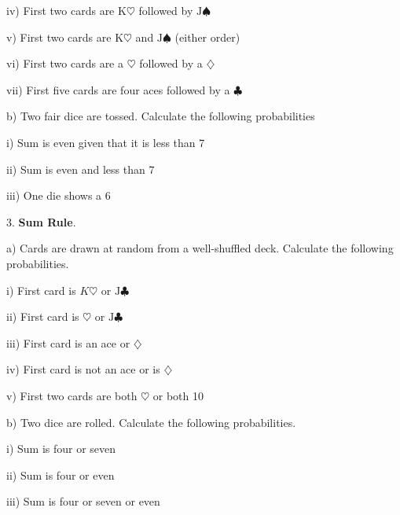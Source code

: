 \documentclass[10pt]{article}
\begin{document}
\hspace{30pt} iv) First two cards are $\mbox{K}\heartsuit$ followed by $\mbox{J}\spadesuit$
\bigskip

\hspace{30pt} v) First two cards are $\mbox{K}\heartsuit$ 
and $\mbox{J}\spadesuit$ (either order)
\bigskip

\hspace{30pt} vi) First two cards are a $\heartsuit$ followed by a $\diamondsuit$
\bigskip

\hspace{30pt} vii) First five cards are four aces followed by a $\clubsuit$
\bigskip

\hspace{20pt} b)  Two fair dice are tossed. Calculate the following probabilities
\medskip

\hspace{30pt} i) Sum is even given that it is less than 7
\bigskip

\hspace{30pt} ii) Sum is even and less than 7
\bigskip

\hspace{30pt} iii) One die shows a 6
\vfill
\eject
{\ }\vspace{20pt}

3. \textbf{Sum Rule}.

\hspace{20pt} a) Cards are drawn at random from a well-shuffled deck.
Calculate the following probabilities.
\medskip

\hspace{30pt} i) First card is $K\heartsuit$ or $\mbox{J}\clubsuit$
\bigskip

\hspace{30pt} ii) First card is $\heartsuit$ or $\mbox{J}\clubsuit$
\bigskip

\hspace{30pt} iii) First card is an ace or $\diamondsuit$
\bigskip

\hspace{30pt} iv) First card is not an ace or is $\diamondsuit$
\bigskip

\hspace{30pt} v) First two cards are both $\heartsuit$ or both 10
\bigskip


\hspace{20pt} b) Two dice are rolled. Calculate the following probabilities.
\medskip

\hspace{30pt} i) Sum is four or seven
\bigskip\bigskip

\hspace{30pt} ii) Sum is four or even
\bigskip\bigskip

\hspace{30pt} iii) Sum is four or seven or even
\vspace{.6in}
\vfill
\eject
\end{document}
